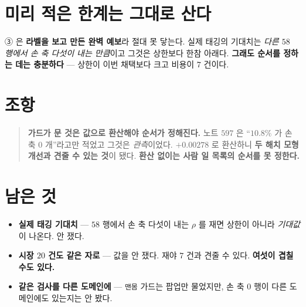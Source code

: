\documentclass[11pt]{article}
\begin{document}
\section*{미리 적은 한계는 그대로 산다}

③ 은 \textbf{라벨을 보고 만든 완벽 예보}라 절대 못 닿는다. 실제 태깅의
기대치는 \emph{다른 $58$ 행에서 손 축 다섯이 내는 만큼}이고 그것은 상한보다
한참 아래다. \textbf{그래도 순서를 정하는 데는 충분하다} --- 상한이 이번
채택보다 크고 비용이 $7$ 건이다.

\section*{조항}

\begin{quote}
\textbf{가드가 문 것은 값으로 환산해야 순서가 정해진다.} 노트 $597$ 은
``$10.8\%$ 가 손 축 $0$ 개''라고만 적었고 그것은 \emph{관측}이었다.
$+0.00278$ 로 환산하니 \textbf{두 해치 모형 개선과 견줄 수 있는 것}이
됐다. \textbf{환산 없이는 사람 일 목록의 순서를 못 정한다.}
\end{quote}

\section*{남은 것}

\begin{itemize}
\item \textbf{실제 태깅 기대치} --- $58$ 행에서 손 축 다섯이 내는 $\rho$ 를
재면 상한이 아니라 \emph{기대값}이 나온다. 안 쟀다.
\item \textbf{시장 $20$ 건도 같은 자로} --- 값을 안 쟀다. 재야 $7$ 건과
견줄 수 있다. \textbf{여섯이 겹칠 수도 있다.}
\item \textbf{같은 검사를 다른 도메인에} --- \texttt{맨몸} 가드는 팝업만
물었지만, 손 축 $0$ 행이 다른 도메인에도 있는지는 안 봤다.
\end{itemize}
\end{document}
